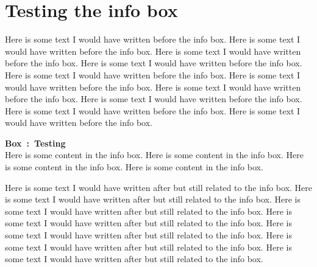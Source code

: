 \documentclass[12pt]{scrartcl}
\newcounter{fobox}[subsection]
\newenvironment{infobox}[3]{
	\refstepcounter{fobox}\par
	\wrapfigure{#2}{#3}
		\boxedminipage{#3}
			\textbf{Box~\thefobox:\ #1}~\\ \noindent}
		{\endboxedminipage
	\endwrapfigure}
\begin{document}
\section{Testing the info box}

Here is some text I would have written before the info box. Here is some text I would have written before the info box. Here is some text I would have written before the info box. Here is some text I would have written before the info box. Here is some text I would have written before the info box. Here is some text I would have written before the info box. Here is some text I would have written before the info box. Here is some text I would have written before the info box. Here is some text I would have written before the info box. Here is some text I would have written before the info box.


\begin{infobox}{Testing}{R}{0.5\textwidth}
	Here is some content in the info box. Here is some content in the info box. Here is some content in the info box. Here is some content in the info box. 
\end{infobox}

Here is some text I would have written after but still related to the info box. Here is some text I would have written after but still related to the info box. Here is some text I would have written after but still related to the info box. Here is some text I would have written after but still related to the info box. Here is some text I would have written after but still related to the info box. Here is some text I would have written after but still related to the info box. Here is some text I would have written after but still related to the info box.
\end{document}
